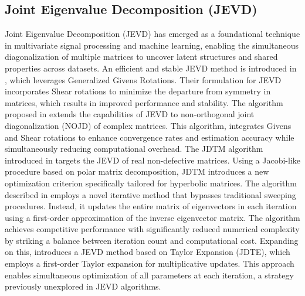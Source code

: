 \subsection{Joint Eigenvalue Decomposition (JEVD)}
Joint Eigenvalue Decomposition (JEVD) has emerged as a foundational technique in multivariate signal processing and machine learning, enabling the simultaneous diagonalization of multiple matrices to uncover latent structures and shared properties across datasets. %
An efficient and stable JEVD method is introduced in \cite{Mesloub2018}, which leverages Generalized Givens Rotations. Their formulation for JEVD incorporates Shear rotations to minimize the departure from symmetry in matrices, which results in improved performance and stability. %
The algorithm proposed in \cite{Mesloub2013} extends the capabilities of JEVD to non-orthogonal joint diagonalization (NOJD) of complex matrices. This algorithm, %
integrates Givens and Shear rotations to enhance convergence rates and estimation accuracy while simultaneously reducing computational overhead. %
The JDTM algorithm introduced in \cite{Luciani2010} targets the JEVD of real non-defective matrices. Using a Jacobi-like procedure based on polar matrix decomposition, JDTM introduces a new optimization criterion specifically tailored for hyperbolic matrices. %
The algorithm described in \cite{Andre2015} employs a novel iterative method that bypasses traditional sweeping procedures. Instead, it updates the entire matrix of eigenvectors in each iteration using a first-order approximation of the inverse eigenvector matrix. The algorithm achieves competitive performance with significantly reduced numerical complexity by striking a balance between iteration count and computational cost. Expanding on this, \cite{Remi2020} introduces a JEVD method based on Taylor Expansion (JDTE), which employs a first-order Taylor expansion for multiplicative updates. This approach enables simultaneous optimization of all parameters at each iteration, a strategy previously unexplored in JEVD algorithms. %

